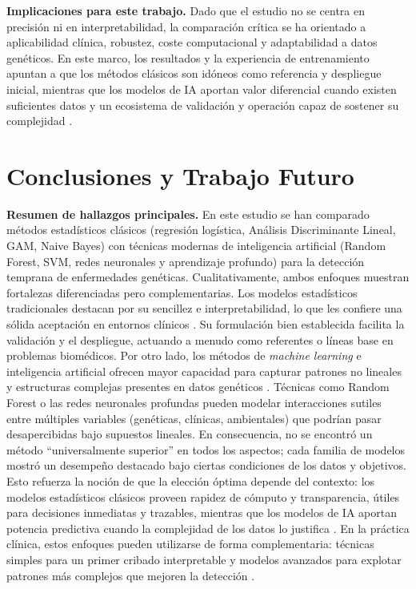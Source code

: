 \documentclass[11pt,a4paper,spanish]{book}
\numberwithin{equation}{chapter}
\numberwithin{figure}{chapter}
\begin{document}
\textbf{Implicaciones para este trabajo.} Dado que el estudio no se centra en precisión ni en interpretabilidad, la comparación crítica se ha orientado a aplicabilidad clínica, robustez, coste computacional y adaptabilidad a datos genéticos. En este marco, los resultados y la experiencia de entrenamiento apuntan a que los métodos clásicos son idóneos como referencia y despliegue inicial, mientras que los modelos de IA aportan valor diferencial cuando existen suficientes datos y un ecosistema de validación y operación capaz de sostener su complejidad \cite{Libbrecht2015,Ching_2018,topol2019}.

\section{Conclusiones y Trabajo Futuro}

\noindent \textbf{Resumen de hallazgos principales.} En este estudio se han comparado métodos estadísticos clásicos (regresión logística, Análisis Discriminante Lineal, GAM, Naive Bayes) con técnicas modernas de inteligencia artificial (Random Forest, SVM, redes neuronales y aprendizaje profundo) para la detección temprana de enfermedades genéticas. Cualitativamente, ambos enfoques muestran fortalezas diferenciadas pero complementarias. Los modelos estadísticos tradicionales destacan por su sencillez e interpretabilidad, lo que les confiere una sólida aceptación en entornos clínicos \cite{10.1093/eurheartj/ehu207}. Su formulación bien establecida facilita la validación y el despliegue, actuando a menudo como referentes o líneas base en problemas biomédicos. Por otro lado, los métodos de \textit{machine learning} e inteligencia artificial ofrecen mayor capacidad para capturar patrones no lineales y estructuras complejas presentes en datos genéticos \cite{Breiman2001,Libbrecht2015,LeCun_2015}. Técnicas como Random Forest o las redes neuronales profundas pueden modelar interacciones sutiles entre múltiples variables (genéticas, clínicas, ambientales) que podrían pasar desapercibidas bajo supuestos lineales. En consecuencia, no se encontró un método “universalmente superior” en todos los aspectos; cada familia de modelos mostró un desempeño destacado bajo ciertas condiciones de los datos y objetivos. Esto refuerza la noción de que la elección óptima depende del contexto: los modelos estadísticos clásicos proveen rapidez de cómputo y transparencia, útiles para decisiones inmediatas y trazables, mientras que los modelos de IA aportan potencia predictiva cuando la complejidad de los datos lo justifica \cite{Libbrecht2015,10.1093/eurheartj/ehu207}. En la práctica clínica, estos enfoques pueden utilizarse de forma complementaria: técnicas simples para un primer cribado interpretable y modelos avanzados para explotar patrones más complejos que mejoren la detección \cite{Libbrecht2015,topol2019}.
\end{document}
